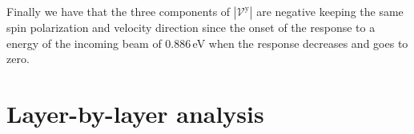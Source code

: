 \documentclass[prb,11pt,tightenlines,twocolumn,aps]{revtex4-1}
\begin{document}
% 
Finally we have that the three components of $|\mathcal{V}^{\mathrm{y}}|$ are
negative keeping the same spin polarization and velocity direction since the
onset of the response to a energy of the incoming beam of 0.886\,eV when the
response decreases and goes to zero.


\section{Layer-by-layer analysis} %
\label{sec:res-layer_by_layer_analysis}
\end{document}

